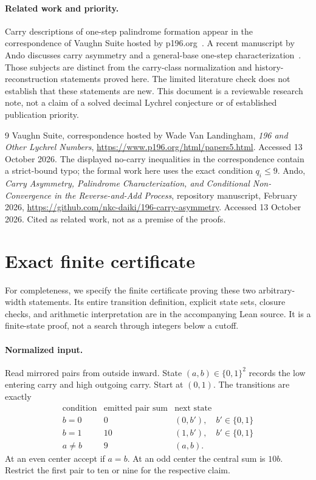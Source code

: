 \documentclass[11pt]{article}
\begin{document}
\paragraph{Related work and priority.}
Carry descriptions of one-step palindrome formation appear in the
correspondence of Vaughn Suite hosted by p196.org~\cite{suite}. A recent
manuscript by Ando discusses carry asymmetry and a general-base one-step
characterization~\cite{ando}. Those subjects are distinct from the
carry-class normalization and history-reconstruction statements proved
here. The limited literature check does not establish that these statements
are new. This document is a reviewable research note, not a claim of a solved
decimal Lychrel conjecture or of established publication priority.

\begin{thebibliography}{9}
 Vaughn Suite, correspondence hosted by Wade Van Landingham,
\emph{196 and Other Lychrel Numbers},
\url{https://www.p196.org/html/papers5.html}.
Accessed 13 October 2026. The displayed no-carry inequalities in the
correspondence contain a strict-bound typo; the formal work here uses
the exact condition $q_i\leq9$.
 Ando, \emph{Carry Asymmetry, Palindrome Characterization,
and Conditional Non-Convergence in the Reverse-and-Add Process},
repository manuscript, February 2026,
\url{https://github.com/nkc-daiki/196-carry-asymmetry}.
Accessed 13 October 2026. Cited as related work, not as a premise of the proofs.
\end{thebibliography}
\appendix
\section{Exact finite certificate}\label{app:certificate}
For completeness, we specify the finite certificate proving these two
arbitrary-width statements. Its entire transition definition, explicit state
sets, closure checks, and arithmetic interpretation are in the accompanying
Lean source. It is a finite-state proof, not a search through integers below
a cutoff.

\paragraph{Normalized input.}
Read mirrored pairs from outside inward. State $(a,b)\in\{0,1\}^2$
records the low entering carry and high outgoing carry. Start at $(0,1)$.
The transitions are exactly
\[
\begin{array}{c|c|c}
\text{condition}&\text{emitted pair sum}&\text{next state}\\\hline
b=0&0&(0,b'),\quad b'\in\{0,1\}\\
b=1&10&(1,b'),\quad b'\in\{0,1\}\\
a\ne b&9&(a,b).
\end{array}
\]
At an even center accept if $a=b$. At an odd center the central sum is $10b$.
Restrict the first pair to ten or nine for the respective claim.
\end{document}
